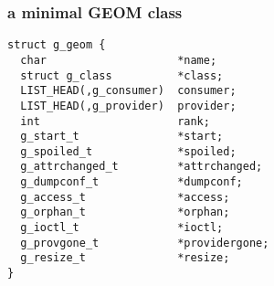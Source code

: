 \documentclass{beamer}
\begin{document}
\begin{frame}[fragile]
\frametitle{a minimal GEOM class}
\small\begin{verbatim}
struct g_geom {
  char                    *name;
  struct g_class          *class;
  LIST_HEAD(,g_consumer)  consumer;
  LIST_HEAD(,g_provider)  provider;
  int                     rank;
  g_start_t               *start;
  g_spoiled_t             *spoiled;
  g_attrchanged_t         *attrchanged;
  g_dumpconf_t            *dumpconf;
  g_access_t              *access;
  g_orphan_t              *orphan;
  g_ioctl_t               *ioctl;
  g_provgone_t            *providergone;
  g_resize_t              *resize;
}
\end{verbatim}
\end{frame}
\end{document}
